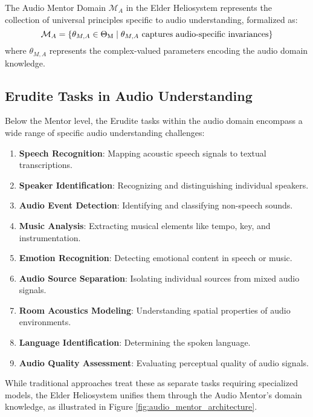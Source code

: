 \begin{definition}
The Audio Mentor Domain $\mathcal{M}_A$ in the Elder Heliosystem represents the collection of universal principles specific to audio understanding, formalized as:
\begin{equation}
\mathcal{M}_A = \{\theta_{M,A} \in \Theta_{\text{M}} \mid \theta_{M,A} \text{ captures audio-specific invariances}\}
\end{equation}
where $\theta_{M,A}$ represents the complex-valued parameters encoding the audio domain knowledge.
\end{definition}

\subsection{Erudite Tasks in Audio Understanding}

Below the Mentor level, the Erudite tasks within the audio domain encompass a wide range of specific audio understanding challenges:

\begin{enumerate}
    \item \textbf{Speech Recognition}: Mapping acoustic speech signals to textual transcriptions.
    \item \textbf{Speaker Identification}: Recognizing and distinguishing individual speakers.
    \item \textbf{Audio Event Detection}: Identifying and classifying non-speech sounds.
    \item \textbf{Music Analysis}: Extracting musical elements like tempo, key, and instrumentation.
    \item \textbf{Emotion Recognition}: Detecting emotional content in speech or music.
    \item \textbf{Audio Source Separation}: Isolating individual sources from mixed audio signals.
    \item \textbf{Room Acoustics Modeling}: Understanding spatial properties of audio environments.
    \item \textbf{Language Identification}: Determining the spoken language.
    \item \textbf{Audio Quality Assessment}: Evaluating perceptual quality of audio signals.
\end{enumerate}

While traditional approaches treat these as separate tasks requiring specialized models, the Elder Heliosystem unifies them through the Audio Mentor's domain knowledge, as illustrated in Figure \ref{fig:audio_mentor_architecture}.

